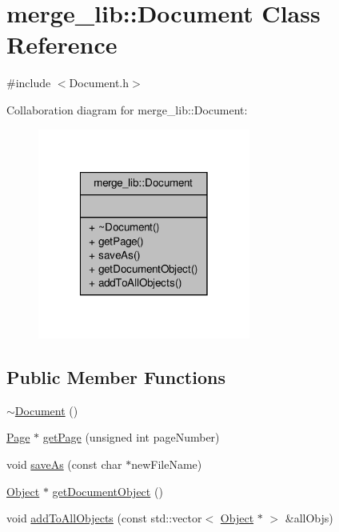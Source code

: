 \hypertarget{classmerge__lib_1_1_document}{\section{merge\-\_\-lib\-:\-:Document Class Reference}
\label{dc/d2e/classmerge__lib_1_1_document}
}


{\ttfamily \#include $<$Document.\-h$>$}



Collaboration diagram for merge\-\_\-lib\-:\-:Document\-:
\nopagebreak
\begin{figure}[H]
\begin{center}
\leavevmode
\includegraphics[width=198pt]{da/d2f/classmerge__lib_1_1_document__coll__graph}
\end{center}
\end{figure}
\subsection*{Public Member Functions}
\begin{DoxyCompactItemize}
\item 
\hyperlink{classmerge__lib_1_1_document_ac2e3f62307dc22baac21ddc10fa1609c}{$\sim$\-Document} ()
\item 
\hyperlink{classmerge__lib_1_1_page}{Page} $\ast$ \hyperlink{classmerge__lib_1_1_document_a6975164cb7c18fc388e6eb6059b2f5c5}{get\-Page} (unsigned int page\-Number)
\item 
void \hyperlink{classmerge__lib_1_1_document_a6687738a8f98a95f3cafbfca7dd7c928}{save\-As} (const char $\ast$new\-File\-Name)
\item 
\hyperlink{classmerge__lib_1_1_object}{Object} $\ast$ \hyperlink{classmerge__lib_1_1_document_acd7bddf194781a0f4862caf8d7898733}{get\-Document\-Object} ()
\item 
void \hyperlink{classmerge__lib_1_1_document_a3d977a03274a3b5353ed034d95a3b714}{add\-To\-All\-Objects} (const std\-::vector$<$ \hyperlink{classmerge__lib_1_1_object}{Object} $\ast$ $>$ \&all\-Objs)
\end{DoxyCompactItemize}
